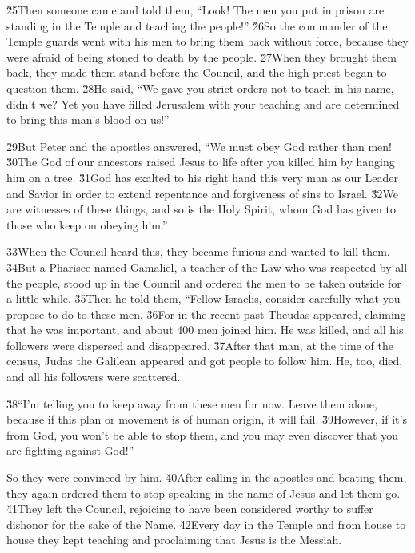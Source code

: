 \v{25}Then someone came and told them, ``Look! The men you put in prison are standing in the Temple and teaching the people!'' \v{26}So the commander of the Temple guards went with his men to bring them back without force, because they were afraid of being stoned to death by the people. \v{27}When they brought them back, they made them stand before the Council, and the high priest began to question them. \v{28}He said, ``We gave you strict orders not to teach in his name, didn't we? Yet you have filled Jerusalem with your teaching and are determined to bring this man's blood on us!''

\v{29}But Peter and the apostles answered, ``We must obey God rather than men! \v{30}The God of our ancestors raised Jesus to life after you killed him by hanging him on a tree. \v{31}God has exalted to his right hand this very man as our Leader and Savior in order to extend repentance and forgiveness of sins to Israel. \v{32}We are witnesses of these things, and so is the Holy Spirit, whom God has given to those who keep on obeying him.''

\v{33}When the Council heard this, they became furious and wanted to kill them. \v{34}But a Pharisee named Gamaliel, a teacher of the Law who was respected by all the people, stood up in the Council and ordered the men to be taken outside for a little while. \v{35}Then he told them, ``Fellow Israelis, consider carefully what you propose to do to these men. \v{36}For in the recent past Theudas appeared, claiming that he was important, and about 400 men joined him. He was killed, and all his followers were dispersed and disappeared. \v{37}After that man, at the time of the census, Judas the Galilean appeared and got people to follow him. He, too, died, and all his followers were scattered.

\v{38}``I'm telling you to keep away from these men for now. Leave them alone, because if this plan or movement is of human origin, it will fail. \v{39}However, if it's from God, you won't be able to stop them, and you may even discover that you are fighting against God!''

So they were convinced by him. \v{40}After calling in the apostles and beating them, they again ordered them to stop speaking in the name of Jesus and let them go. \v{41}They left the Council, rejoicing to have been considered worthy to suffer dishonor for the sake of the Name. \v{42}Every day in the Temple and from house to house they kept teaching and proclaiming that Jesus is the Messiah.

